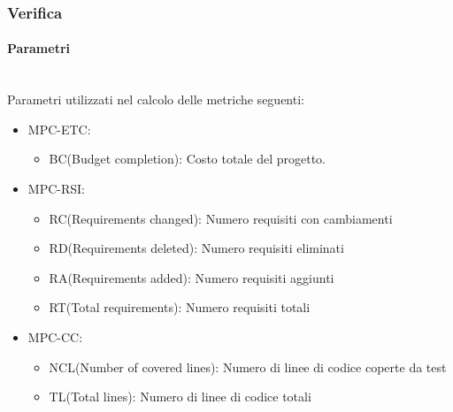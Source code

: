 \subsubsection{Verifica}

\paragraph{Parametri}\mbox{}\\
Parametri utilizzati nel calcolo delle metriche seguenti:
\begin{itemize}
    \item MPC-ETC:
          \begin{itemize}
              \item BC(Budget completion): Costo totale del progetto.
          \end{itemize}
    \item MPC-RSI:
          \begin{itemize}
              \item RC(Requirements changed): Numero requisiti con cambiamenti
              \item RD(Requirements deleted): Numero requisiti eliminati
              \item RA(Requirements added): Numero requisiti aggiunti
              \item RT(Total requirements): Numero requisiti totali
          \end{itemize}

    \item MPC-CC:
          \begin{itemize}
              \item NCL(Number of covered lines): Numero di linee di codice coperte da test
              \item TL(Total lines): Numero di linee di codice totali
          \end{itemize}
\end{itemize}

